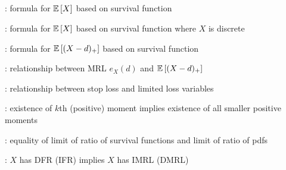 \subsection*{}
\item {}: formula for \(\mathbb{E}\left[X\right]\) based on survival function
\item {}: formula for \(\mathbb{E}\left[X\right]\) based on survival function where \(X\) is discrete
\item {}: formula for \(\mathbb{E}\left[(X-d)_{+}\right]\) based on survival function
\item {}: relationship between MRL \(e_X(d)\) and \(\mathbb{E}\left[(X-d)_{+}\right]\)
\item {}: relationship between stop loss and limited loss variables
\item {}: existence of \(k\)th (positive) moment implies existence of all smaller positive moments
\item {}: equality of limit of ratio of survival functions and limit of ratio of pdfs
\item {}: \(X\) has DFR (IFR) implies \(X\) has IMRL (DMRL)
